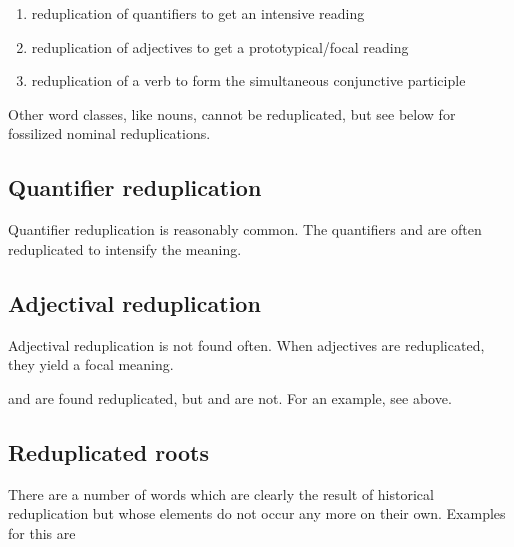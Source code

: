 \begin{enumerate}
 \item reduplication of quantifiers to get an intensive reading
 \item reduplication of adjectives to get a prototypical/focal reading
 \item reduplication of a verb to form the simultaneous conjunctive participle
\end{enumerate}

Other word classes, like  nouns, cannot be reduplicated, but see below for fossilized nominal reduplications.


\subsection{Quantifier reduplication}\label{sec:wofo:Quantifierreduplication}
Quantifier reduplication is reasonably common.
The quantifiers  and  are often reduplicated to intensify the meaning.



\subsection{Adjectival reduplication}\label{sec:wofo:Adjectivalreduplication}
Adjectival reduplication is not found often. When adjectives are reduplicated, they yield a focal meaning.



 and  are found reduplicated, but  and  are not. For an example, see  above.

\subsection{Reduplicated roots}\label{sec:wofo:Reduplicatedroots}
There are a number of words which are clearly the result of historical reduplication but whose elements do not occur any more on their own. Examples for this are

